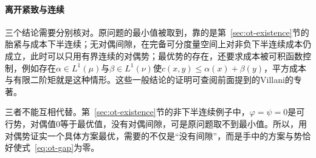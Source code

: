 \paragraph{离开紧致与连续}
三个结论需要分别核对。原问题的最小值被取到，靠的是第~\ref{sec:ot-existence}节的胎紧与成本下半连续；无对偶间隙，在完备可分度量空间上对非负下半连续成本仍成立，此时可以只用有界连续的对偶势；最优势的存在，还要求成本被可积函数控制，例如存在$\alpha\in L^{1}(\mu)$与$\beta\in L^{1}(\nu)$使$c(x,y)\leq\alpha(x)+\beta(y)$，平方成本与有限二阶矩就是这种情形。这些一般结论的证明可查阅前面提到的Villani的专著。

三者不能互相代替。第~\ref{sec:ot-existence}节的非下半连续例子中，$\varphi=\psi=0$是可行势，对偶值$0$等于最优值，没有对偶间隙，可是原问题取不到最小值。所以，用对偶势证实一个具体方案最优，需要的不仅是“没有间隙”，而是手中的方案与势恰好使式~\eqref{eq:ot-gap}为零。
